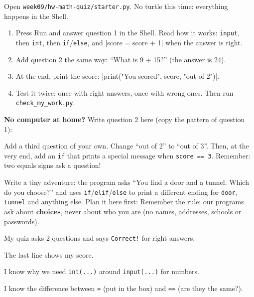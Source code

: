 \namedateline

\begin{core}
Open \texttt{week09/hw-math-quiz/starter.py}. No turtle this time: everything happens in the Shell.
\begin{enumerate}[leftmargin=1.4em,itemsep=1pt]
  \item Press Run and answer question 1 in the Shell. Read how it works: \texttt{input}, then \texttt{int}, then \texttt{if}/\texttt{else}, and \py|score = score + 1| when the answer is right.
  \item Add question 2 the same way: \enquote{What is 9 + 15?} (the answer is 24).
  \item At the end, print the score: \py|print("You scored", score, "out of 2")|.
  \item Test it twice: once with right answers, once with wrong ones. Then run \texttt{check\_my\_work.py}.
\end{enumerate}
\textbf{No computer at home?} Write question 2 here (copy the pattern of question 1):
\end{core}

\begin{challenge}
Add a third question of your own. Change \enquote{out of 2} to \enquote{out of 3}. Then, at the very end, add an \texttt{if} that prints a special message when \texttt{score == 3}. Remember: two equals signs ask a question!
\end{challenge}

\begin{creative}
Write a tiny adventure: the program asks \enquote{You find a door and a tunnel. Which do you choose?} and uses \texttt{if}/\texttt{elif}/\texttt{else} to print a different ending for \texttt{door}, \texttt{tunnel} and anything else. Plan it here first:
Remember the rule: our programs ask about \textbf{choices}, never about who you are (no names, addresses, schools or passwords).
\end{creative}

\begin{selfcheck}
  \item My quiz asks 2 questions and says \texttt{Correct!} for right answers.
  \item The last line shows my score.
  \item I know why we need \texttt{int(...)} around \texttt{input(...)} for numbers.
  \item I know the difference between \texttt{=} (put in the box) and \texttt{==} (are they the same?).
\end{selfcheck}
